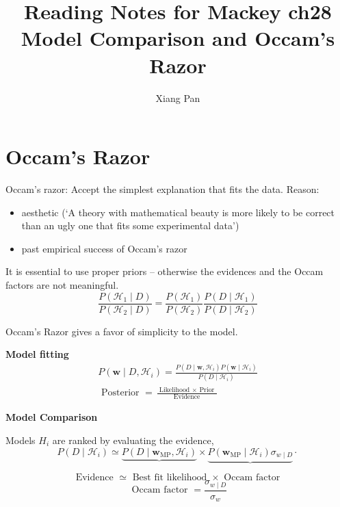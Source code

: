 \documentclass{article}
\title{Reading Notes for Mackey ch28 Model Comparison and Occam’s Razor}
\author{Xiang Pan}
\begin{document}
\maketitle
\section{Occam’s Razor}
Occam’s razor: Accept the simplest explanation that ﬁts the data.
Reason:
\begin{itemize}
    \item aesthetic (‘A theory with mathematical beauty is more likely to be correct than an ugly one that ﬁts some experimental data’)
    \item past empirical success of Occam’s razor
\end{itemize}

It is essential to use proper priors – otherwise the evidences and the Occam factors are not meaningful.
$$
\frac{P\left(\mathcal{H}_{1} \mid D\right)}{P\left(\mathcal{H}_{2} \mid D\right)}=\frac{P\left(\mathcal{H}_{1}\right)}{P\left(\mathcal{H}_{2}\right)} \frac{P\left(D \mid \mathcal{H}_{1}\right)}{P\left(D \mid \mathcal{H}_{2}\right)}
$$

Occam’s Razor gives a favor of simplicity to the model.


\textbf{Model fitting}
\begin{equation}
    \begin{gathered}
    P\left(\mathbf{w} \mid D, \mathcal{H}_{i}\right)=\frac{P\left(D \mid \mathbf{w}, \mathcal{H}_{i}\right) P\left(\mathbf{w} \mid \mathcal{H}_{i}\right)}{P\left(D \mid \mathcal{H}_{i}\right)} \\
    \text { Posterior }=\frac{\text { Likelihood } \times \text { Prior }}{\text { Evidence }}
    \end{gathered}
\end{equation}


\textbf{Model Comparison}

Models $H_i$ are ranked by evaluating the evidence,
\begin{equation}
P\left(D \mid \mathcal{H}_{i}\right) \simeq \underbrace{P\left(D \mid \mathbf{w}_{\mathrm{MP}}, \mathcal{H}_{i}\right)} \times \underbrace{P\left(\mathbf{w}_{\mathrm{MP}} \mid \mathcal{H}_{i}\right) \sigma_{w \mid D}} \cdot
\end{equation}

$$
\text { Evidence } \simeq \text { Best fit likelihood } \times \text { Occam factor }
$$
$$
\text { Occam factor }=\frac{\sigma_{w \mid D}}{\sigma_{w}}
$$
\end{document}
